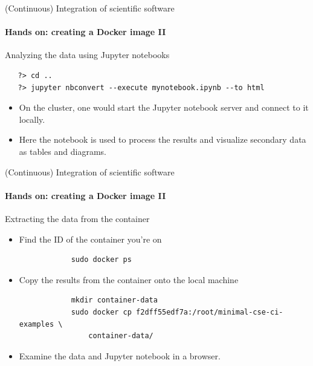 \begin{frame}[fragile]{(Continuous) Integration of scientific software} 
    \framesubtitle{Hands on: creating a Docker image II} 
    \vfill

    Analyzing the data using Jupyter notebooks

\begin{verbatim}
   ?> cd ..
   ?> jupyter nbconvert --execute mynotebook.ipynb --to html 
\end{verbatim}

    \begin{itemize}
        \item On the cluster, one would start the Jupyter notebook server and connect to it locally. 
        \item Here the notebook is used to process the results and visualize secondary data as tables and diagrams.
    \end{itemize}

\end{frame}

\begin{frame}[fragile]{(Continuous) Integration of scientific software} 
    \framesubtitle{Hands on: creating a Docker image II} 
    \vfill

    Extracting the data from the container 

    \begin{itemize}
        \item Find the ID of the container you're on 
            
            \begin{verbatim}
            sudo docker ps 
            \end{verbatim}

        \item Copy the results from the container onto the local machine 
            \begin{verbatim}
            mkdir container-data
            sudo docker cp f2dff55edf7a:/root/minimal-cse-ci-examples \
                container-data/
            \end{verbatim}
        \item Examine the data and Jupyter notebook in a browser.
    \end{itemize}

\end{frame}

